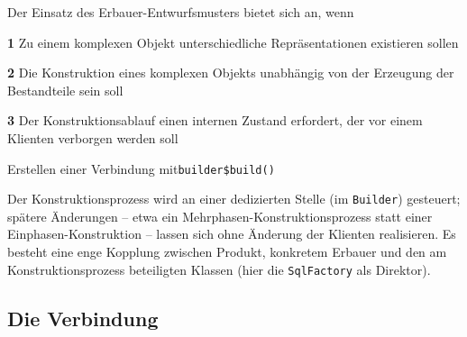 \documentclass[]{article}
\newenvironment{Shaded}{\begin{snugshade}}{\end{snugshade}}
\newcommand{\CommentTok}[1]{\textcolor[rgb]{0.56,0.35,0.01}{\textit{#1}}}
\newcommand{\KeywordTok}[1]{\textcolor[rgb]{0.13,0.29,0.53}{\textbf{#1}}}
\newcommand{\NormalTok}[1]{#1}
\newcommand{\OperatorTok}[1]{\textcolor[rgb]{0.81,0.36,0.00}{\textbf{#1}}}
\begin{document}
Der Einsatz des Erbauer-Entwurfsmusters bietet sich an, wenn

\textbf{1} Zu einem komplexen Objekt unterschiedliche Repräsentationen
existieren sollen

\textbf{2} Die Konstruktion eines komplexen Objekts unabhängig von der
Erzeugung der Bestandteile sein soll

\textbf{3} Der Konstruktionsablauf einen internen Zustand erfordert, der
vor einem Klienten verborgen werden soll

Erstellen einer Verbindung mit\texttt{builder\$build()}

\begin{Shaded}
\end{Shaded}

Der Konstruktionsprozess wird an einer dedizierten Stelle (im
\texttt{Builder}) gesteuert; spätere Änderungen -- etwa ein
Mehrphasen-Konstruktionsprozess statt einer Einphasen-Konstruktion --
lassen sich ohne Änderung der Klienten realisieren. Es besteht eine enge
Kopplung zwischen Produkt, konkretem Erbauer und den am
Konstruktionsprozess beteiligten Klassen (hier die \texttt{SqlFactory}
als Direktor).

\hypertarget{die-verbindung}{%
\subsection{Die Verbindung}\label{die-verbindung}}

\begin{Shaded}
\end{Shaded}
\end{document}
